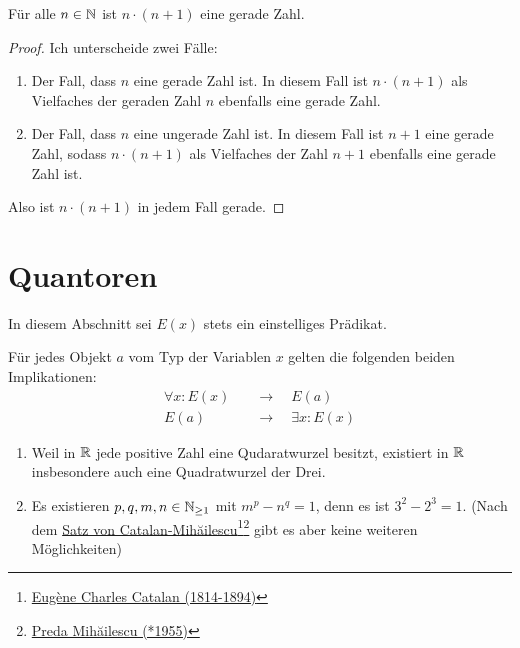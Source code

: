 \begin{bsp} \label{bsp:fallunterscheidung}
    Für alle $n\in \mathbb N$ ist $n\cdot (n+1)$ eine gerade Zahl.
\end{bsp}
\begin{proof}
    Ich unterscheide zwei Fälle:
    \begin{enumerate}[1)]
        \item Der Fall, dass $n$ eine gerade Zahl ist. In diesem Fall ist $n\cdot (n+1)$ als Vielfaches der geraden Zahl $n$ ebenfalls eine gerade Zahl.
        \item Der Fall, dass $n$ eine ungerade Zahl ist. In diesem Fall ist $n+1$ eine gerade Zahl, sodass $n\cdot (n+1)$ als Vielfaches der Zahl $n+1$ ebenfalls eine gerade Zahl ist.
    \end{enumerate}
    Also ist $n\cdot(n+1)$ in jedem Fall gerade.
\end{proof}





\section{Quantoren}


In diesem Abschnitt sei $E(x)$ stets ein einstelliges Prädikat.


\begin{axiom}[*] \label{quantorenaxiom}
    Für jedes Objekt $a$ vom Typ der Variablen $x$ gelten die folgenden beiden Implikationen:
    \begin{align*}
         \forall x: E(x) \quad& \to\quad E(a) \\
         E(a) \quad & \to\quad \exists x: E(x)
    \end{align*}
\end{axiom}

 
\begin{bsp}[*] \quad
    \begin{enumerate}
        \item Weil in $\mathbb R$ jede positive Zahl eine Qudaratwurzel besitzt, existiert in $\mathbb R$ insbesondere auch eine Quadratwurzel der Drei.
        \item Es existieren $p,q,m,n\in \mathbb N_{\ge 1}$ mit $m^p-n^q=1$, denn es ist $3^2-2^3=1$. (Nach dem \href{https://de.wikipedia.org/wiki/Catalansche_Vermutung}{Satz von Catalan-Mihăilescu}\footnote{\href{https://de.wikipedia.org/wiki/Eug\%C3\%A8ne_Charles_Catalan}{Eugène Charles Catalan (1814-1894)}}\footnote{\href{https://de.wikipedia.org/wiki/Preda_Mih\%C4\%83ilescu}{Preda Mihăilescu (*1955)}} gibt es aber keine weiteren Möglichkeiten)
    \end{enumerate}
\end{bsp}



